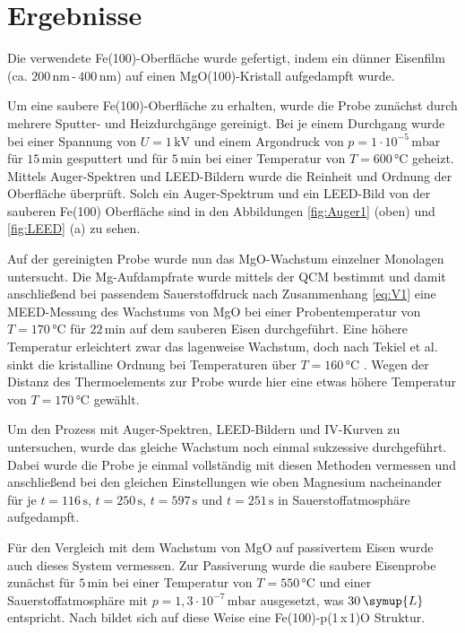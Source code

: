\chapter{Ergebnisse}
Die verwendete Fe(100)-Oberfläche wurde gefertigt, 
indem ein dünner Eisenfilm (ca. $200\,\si{\nano\meter}$\,-\,$400\,\si{\nano\meter}$) auf einen MgO(100)-Kristall aufgedampft wurde.

Um eine saubere Fe(100)-Oberfläche zu erhalten,
wurde die Probe zunächst durch mehrere Sputter- und Heizdurchgänge
gereinigt. Bei je einem Durchgang wurde bei einer Spannung von $U=1\,\si{\kilo\volt}$ und 
einem Argondruck von $p=1\cdot 10^{-5}\,\si{\milli\bar}$ für 
$15\,\si{\minute}$ gesputtert
und für $5\,\si{\minute}$ bei einer Temperatur von $T=600\,\si{\celsius}$ geheizt. Mittels Auger-Spektren und LEED-Bildern 
wurde die Reinheit und Ordnung der Oberfläche überprüft. 
Solch ein Auger-Spektrum und ein LEED-Bild von der sauberen Fe(100) Oberfläche sind in den Abbildungen \ref{fig:Auger1} 
(oben) und  \ref{fig:LEED} (a) zu sehen.



Auf der gereinigten Probe wurde nun das MgO-Wachstum einzelner Monolagen untersucht.
Die Mg-Aufdampfrate wurde mittels der QCM bestimmt 
und damit anschließend bei passendem Sauerstoffdruck nach Zusammenhang \ref{eq:V1} 
eine MEED-Messung des Wachstums von MgO bei einer Probentemperatur von $T=170\,\si{\celsius}$
für $22\,\si{\minute}$ auf dem sauberen Eisen durchgeführt. 
Eine höhere Temperatur erleichtert zwar das lagenweise Wachstum, doch 
nach Tekiel et al. sinkt die kristalline Ordnung bei Temperaturen über $T=160\,\si{\celsius}$ \cite{tekiel2013reactive}. 
Wegen der Distanz des Thermoelements zur Probe wurde hier eine etwas höhere Temperatur von $T=170\,\si{\celsius}$ gewählt.

Um den Prozess mit Auger-Spektren, LEED-Bildern und IV-Kurven zu untersuchen, wurde das gleiche Wachstum noch einmal 
sukzessive durchgeführt. Dabei wurde die Probe je einmal vollständig mit diesen Methoden vermessen und anschließend 
bei den gleichen Einstellungen wie oben Magnesium nacheinander für je $t=116\,\si{\second}$, $t=250\,\si{\second}$, $t=597\,\si{\second}$ 
und $t=251\,\si{\second}$ in Sauerstoffatmosphäre aufgedampft.

Für den Vergleich mit dem Wachstum von MgO auf passivertem Eisen wurde auch dieses System vermessen.
Zur Passiverung wurde die saubere Eisenprobe zunächst für $5\,\si{\minute}$ bei einer Temperatur von $T=550\,\si{\celsius}$ 
und einer Sauerstoffatmosphäre mit 
$p=1,3\cdot 10^{-7}\,\si{\milli\bar}$ ausgesetzt, was $30\,\symup{L}$ entspricht. 
Nach \cite{picone2016controlling} bildet sich auf diese Weise eine Fe(100)-p(1\,x\,1)O Struktur.
\newpage
